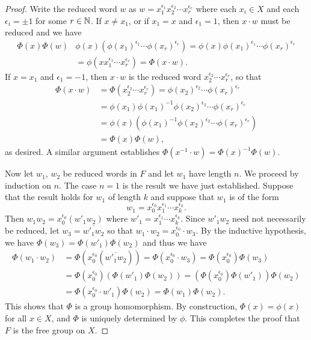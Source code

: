 \begin{proof}
    Write the reduced word \(w\) as \(w = x_1^{\epsilon_1} x_2^{\epsilon_2}
    \cdots x_r ^{\epsilon_r}\) where each \(x_i \in X\) and each \(\epsilon_i =
    \pm 1\) for some \(r \in \mathbb{N}\). If \(x \neq x_1\), or if \(x_1 = x\) and
    \(\epsilon_1 = 1\), then \(x \cdot w\) must be reduced and we have
    \begin{align*}
        \Phi(x)\Phi(w) & \phi(x)(\phi(x_1)^{\epsilon_1} \cdots \phi(x_r)^{\epsilon_r}) = \phi(x)\phi(x_1)^{\epsilon_1} \cdots \phi(x_r)^{\epsilon_r} \\
                       & = \phi(x x_1^{\epsilon_1} \cdots x_r^{\epsilon_r}) = \Phi(x \cdot w).
    \end{align*}
    If \(x = x_1\) and \(\epsilon_1 = -1\), then  \(x \cdot w\) is the reduced
    word \(x_2^{\epsilon_2} \cdots x_r^{\epsilon_r}\), so that
    \begin{align*}
        \Phi(x \cdot w) & = \Phi(x_2^{\epsilon_2} \cdots x_r^{\epsilon_r}) = \phi(x_2)^{\epsilon_2} \cdots \phi(x_r)^{\epsilon_r} \\
            & = \phi(x_1)\phi(x_1)^{-1}\phi(x_2)^{\epsilon_2} \cdots \phi(x_r)^{\epsilon_r} \\ &= \phi(x)(\phi(x_1)^{-1}\phi(x_2)^{\epsilon_2} \cdots \phi(x_r)^{\epsilon_r}) \\
            & = \Phi(x)\Phi(w),
    \end{align*}
    as desired. A similar argument establishes \(\Phi(x^{-1} \cdot w) =
    \Phi(x)^{-1}\Phi(w)\).

    Now let \(w_1\), \(w_2\) be reduced words in \(F\) and let \(w_1\) have
    length \(n\). We proceed by induction on \(n\). The case \(n = 1\) is the
    result we have just established. Suppose that the result holds for \(w_1\)
    of length \(k\) and suppose that \(w_1\) is of the form
    \[
        w_1 = x_0^{\epsilon_0} x_1^{\epsilon_1} \cdots x_k^{\epsilon_k}.
    \]
    Then \(w_1w_2 = x_0^{\epsilon_0} (w'_1 w_2)\) where \(w'_1 =
    x_1^{\epsilon_1} \cdots x_k^{\epsilon_k}\). Since \(w'_1w_2\) need not
    necessarily be reduced, let \(w_3 = \overline{w'_1 w_2}\) so that \(w_1
    \cdot w_2 = x_0^{\epsilon_0} \cdot w_3\). By the inductive hypothesis, we
    have \(\Phi(w_3) = \Phi(w'_1) \Phi(w_2)\) and thus we have
    \begin{align*}
        \Phi(w_1 \cdot w_2) & = \Phi(x_0^{\epsilon_0}(\overline{w'_1 w_2})) = \Phi(x_0^{\epsilon_0} \cdot w_3) = \Phi(x_0^{\epsilon_0}) \Phi(w_3) \\
                            & = \Phi(x_0^{\epsilon_0})\left(\Phi(w'_1) \Phi(w_2)\right) = \left(\Phi(x_0^{\epsilon_0}) \Phi(w'_1)\right) \Phi(w_2) \\
                            & = \Phi(x_0^{\epsilon_0} \cdot w'_1) \Phi(w_2) = \Phi(w_1) \Phi(w_2).
    \end{align*}
    This shows that \(\Phi\) is a group homomorphism. By construction, \(\Phi(x)
    = \phi(x)\) for all \(x \in X\), and \(\Phi\) is uniquely determined by
    \(\phi\). This completes the proof that \(F\) is the free group on \(X\).
\end{proof}


